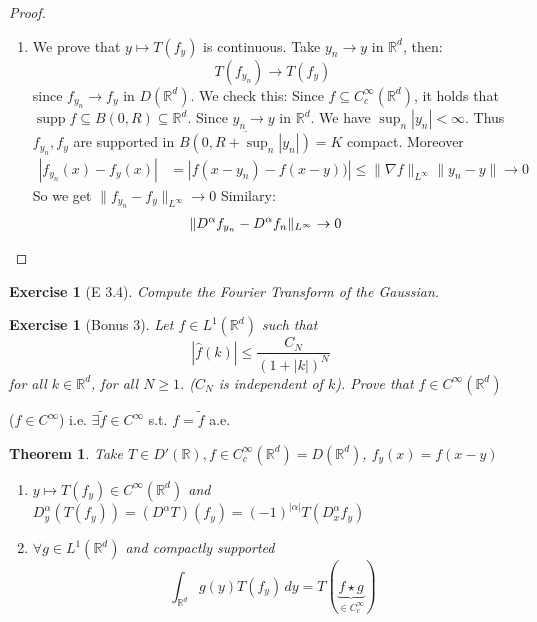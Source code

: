 \documentclass{report}
\theoremstyle{tommy}
\newtheorem{thm}[defn]{Theorem}
\newtheorem{ex}[defn]{Exercise}
\newcommand{\supp}{\operatorname{supp}}
\begin{document}
  \begin{proof}
    \begin{enumerate}
      \item We prove that \(y \mapsto T(f_y)\) is continuous. Take \(y_n \to y\) in \(\mathbb{R}^d\), then:\[T(f_{y_n}) \to T(f_y)\] since \(f_{y_n} \to f_y\) in \(D(\mathbb{R}^d)\). We check this: Since \(f \subseteq C_c^\infty(\mathbb{R}^d)\), it holds that \(\supp f \subseteq B(0, R) \subseteq \mathbb{R}^d\). Since \(y_n \to y\) in \(\mathbb{R}^d\). We have \(\sup_n |y_n| < \infty\). Thus \(f_{y_n}, f_y\) are supported in \(\overline{B(0, R + \sup_n |y_n|)} = K\) compact. Moreover
      \begin{align*}
        |f_{y_n}(x) - f_y(x)|
        &= |f(x-y_n) - f(x-y))|
        \le \| \nabla f \|_{L^\infty} \|y_n - y\| \to 0
      \end{align*}
      So we get \(\| f_{y_n} - f_y\|_{L^\infty} \to 0\)
      Similary:
      \begin{align}
        \|D^\alpha f_{y_n} - D^\alpha f_n \|_{L^\infty} &\to 0 \qedhere
      \end{align}
    \end{enumerate}
  \end{proof}

  \begin{ex}[E 3.4]
    Compute the Fourier Transform of the Gaussian.
  \end{ex}
  
  \begin{ex}[Bonus 3]
    Let \(f \in L^1(\mathbb{R}^d)\) such that
    \[|\hat f(k)| \le \frac{C_N}{(1 + |k|)^N}\]
    for all \(k \in \mathbb{R}^d\), for all \(N \ge 1\). (\(C_N\) is independent of \(k\)). Prove that \(f \in C^\infty(\mathbb{R}^d)\)
  \end{ex}
  (\(f \in C^\infty\)) i.e. \(\exists \tilde f \in C^\infty\) s.t. \(f = \tilde f\) a.e.

  \begin{thm}
    Take \(T \in D'(\mathbb{R}), f \in C_c^\infty(\mathbb{R}^d) = D(\mathbb{R}^d)\), \(f_y(x) = f(x-y)\)
    \begin{enumerate}[label=\alph*)]
      \item \(y \mapsto T(f_y) \in C^\infty(\mathbb{R}^d)\) and \(D_y^\alpha(T(f_y)) = (D^\alpha T) (f_y) = (-1)^{|\alpha|} T(D_x^\alpha f_y)\)
      \item \(\forall g \in L^1(\mathbb{R}^d)\) and compactly supported 
      \[\int_{\mathbb{R}^d} g(y) T(f_y) \, dy = T(\underbrace{f \star g}_{\in C_c^\infty})\]
    \end{enumerate}
  \end{thm}
\end{document}
